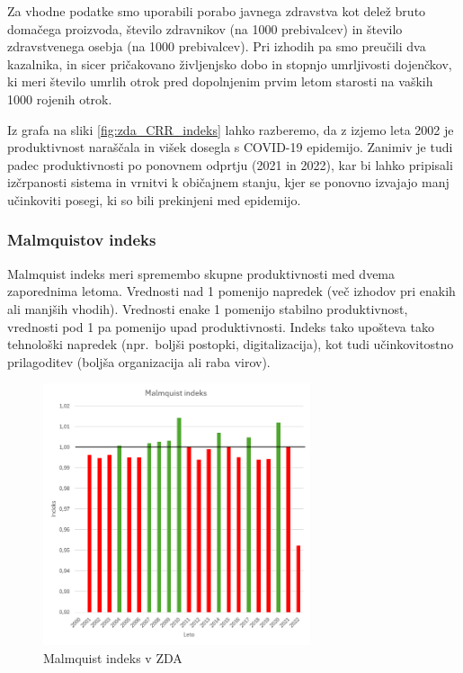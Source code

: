 \documentclass[12pt,a4paper]{article}
\theoremstyle{definition}
\begin{document}
Za vhodne podatke smo uporabili porabo javnega zdravstva kot delež bruto domačega proizvoda, 
število zdravnikov (na 1000 prebivalcev) in število zdravstvenega osebja (na 1000 prebivalcev). 
Pri izhodih pa smo preučili dva kazalnika, in sicer pričakovano življenjsko dobo in stopnjo umrljivosti dojenčkov, 
ki meri število umrlih otrok pred dopolnjenim prvim letom starosti na vaških 1000 rojenih otrok.

Iz grafa na sliki \ref{fig:zda_CRR_indeks} lahko razberemo, da z izjemo leta 2002 je produktivnost
naraščala in višek dosegla s COVID-19 epidemijo. Zanimiv je tudi padec produktivnosti po
ponovnem odprtju (2021 in 2022), kar bi lahko pripisali izčrpanosti
sistema in vrnitvi k običajnem stanju, kjer se ponovno izvajajo
manj učinkoviti posegi, ki so bili prekinjeni med epidemijo.

\subsubsection{Malmquistov indeks}

Malmquist indeks meri spremembo skupne produktivnosti med dvema zaporednima letoma. Vrednosti
nad 1 pomenijo napredek (več izhodov pri enakih ali manjših vhodih). Vrednosti enake 1 pomenijo stabilno produktivnost,
vrednosti pod 1 pa pomenijo upad produktivnosti. Indeks tako upošteva tako tehnološki napredek (npr.\ boljši postopki, digitalizacija),
kot tudi učinkovitostno prilagoditev (boljša organizacija ali raba virov).

\begin{figure}[H]
    \centering
    \includegraphics[width=0.7\textwidth]{zda_malmquist_indeks.png}
    \caption{Malmquist indeks v ZDA}
    \label{fig:zda_malmquist_indeks}
\end{figure}
\end{document}

